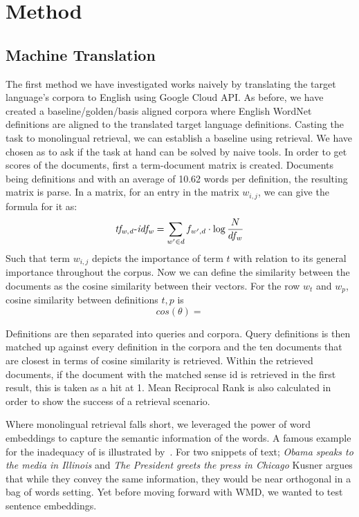\chapter{Method}
\label{chap:method}

\section{Machine Translation}

The first method we have investigated works naively by translating the target language's corpora to English using Google Cloud API\@. %
As before, we have created a baseline/golden/basis aligned corpora where English WordNet definitions are aligned to the translated target language definitions.
Casting the task to monolingual retrieval, we can establish a baseline using \tfidf{} retrieval.
We have chosen \tfidf{} as to ask if the task at hand can be solved by naive tools.
In order to get \tfidf{} scores of the documents, first a term-document matrix is created.
Documents being definitions and with an average of 10.62 words per definition, the resulting matrix is parse.
In a \tfidf{} matrix, for an entry in the matrix $w_{i,j}$, we can give the formula for it as:
\begin{equation*}
    {\operatorname{\mathit{tf_{w,d}-idf_{w}}}} = {\sum_{w' \in d}{f_{w',d}}} \cdot \log \frac {N} {df_w}
\end{equation*}
Such that term $w_{i,j}$ depicts the importance of term $t$ with relation to its general importance throughout the corpus.
Now we can define the similarity between the documents as the cosine similarity between their \tfidf{} vectors.
For the row $w_t$ and $w_p$, cosine similarity between definitions $t, p$ is
\begin{equation*}
    cos(\theta) =
\end{equation*}

Definitions are then separated into queries and corpora.
Query definitions is then matched up against every definition in the corpora and the ten documents that are closest in terms of cosine similarity is retrieved.
Within the retrieved documents, if the document with the matched sense id is retrieved in the first result, this is taken as a hit at 1.
Mean Reciprocal Rank is also calculated in order to show the success of a retrieval scenario.

Where monolingual retrieval falls short, we leveraged the power of word embeddings to capture the semantic information of the words.
A famous example for the inadequacy of \tfidf{} is illustrated by~\cite{kusner_word_2015-2}.
For two snippets of text; \emph{Obama speaks to the media in Illinois} and \emph{The President greets the press in Chicago} Kusner argues that while they convey the same information, they would be near orthogonal in a bag of words setting.
Yet before moving forward with WMD, we wanted to test sentence embeddings.

